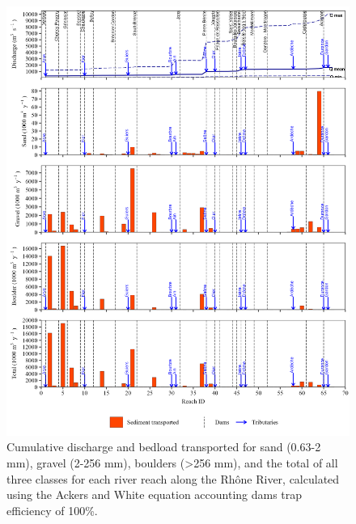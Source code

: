 \documentclass[
]{book}
\begin{document}
\begin{figure}
\includegraphics[width=26.24in]{img/res_cascade/res_E3_eA&W/plots_transp-silt/transp_res_sum_hy_E3_eA&W} \caption{Cumulative discharge and bedload transported for sand (0.63-2 mm), gravel (2-256 mm), boulders (>256 mm), and the total of all three classes for each river reach along the Rhône River, calculated using the Ackers and White equation accounting dams trap efficiency of 100\%.}\label{fig:TrE3eA}
\end{figure}
\end{document}
